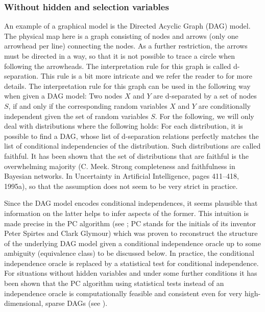 \documentclass[article]{jss}
\begin{document}
\subsubsection{Without hidden and selection variables}
An example of a graphical model is the Directed Acyclic Graph (DAG)
model. The physical map here is a graph consisting of nodes and arrows
(only one arrowhead per line) connecting the nodes. As a further
restriction, the arrows must be directed in a way, so that it is not
possible to trace a circle when following the arrowheads. The
interpretation rule for this graph is called d-separation. This rule is a
bit more intricate and we refer the reader to \cite{lauritzen} for more
details. The interpretation rule for this graph can be used in the
following way when given a DAG model: Two nodes $X$ and $Y$ are d-separated
by a set of nodes $S$, if and only if the corresponding random variables
$X$ and $Y$ are conditionally independent given the set of random variables
$S$. For the following, we will only deal with distributions where the
following holds: For each distribution, it is possible to find a DAG, whose
list of d-separation relations perfectly matches the list of conditional
independencies of the distribution. Such distributions are called
faithful. It has been shown that the set of distributions that are faithful
is the overwhelming majority (C. Meek. Strong completeness and faithfulness
in Bayesian networks. In Uncertainty in Artificial Intelligence, pages
411–418, 1995a), so that the assumption does not seem to be very strict in
practice.

Since the DAG model encodes conditional independences, it seems plausible
that information on the latter helps to infer aspects of the former. This
intuition is made precise in the PC algorithm (see \cite{SpirtesEtAl00}; PC stands for the
initials of its inventor Peter Spirtes and Clark Glymour) which was proven
to reconstruct the structure of the underlying DAG model given a
conditional independence oracle up to some ambiguity (equivalence class)
to be discussed below. In practice, the conditional independence oracle is
replaced by a statistical test for conditional independence. For situations
without hidden variables and under some further conditions it has been
shown that the PC algorithm using statistical tests instead of an
independence oracle is computationally feasible and consistent even for very
high-dimensional, sparse DAGs (see \cite{KaBu07a}).
\end{document}
